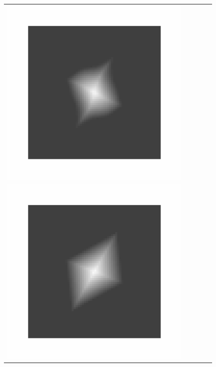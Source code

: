 \begin{figure}[!tb]
\begin{tabular}{c@{}c@{}c@{}c@{}c}
  \includegraphics[scale=0.18,trim={5ex 5ex 5ex 5ex},clip=true]{ScriptedImages/itkv4_SVF_MSD_Image.pdf}\\
  \includegraphics[scale=0.18,trim={5ex 5ex 5ex 5ex},clip=true]{ScriptedImages/moving.pdf}&

\end{tabular}
\end{figure}
